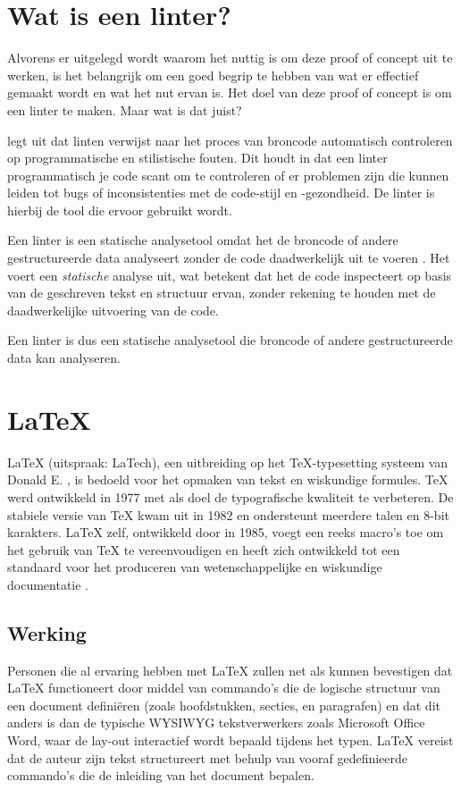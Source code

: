 \section{Wat is een linter?}
Alvorens er uitgelegd wordt waarom het nuttig is om deze proof of concept uit te werken, is het belangrijk om een goed begrip te hebben van wat er effectief gemaakt wordt en wat het nut ervan is. Het doel van deze proof of concept is om een linter te maken. Maar wat is dat juist?

\textcite{Kamunya2023} legt uit dat linten verwijst naar het proces van broncode automatisch controleren op programmatische en stilistische fouten. Dit houdt in dat een linter programmatisch je code scant om te controleren of er problemen zijn die kunnen leiden tot bugs of inconsistenties met de code-stijl en -gezondheid. De linter is hierbij de tool die ervoor gebruikt wordt.

Een linter is een statische analysetool omdat het de broncode of andere gestructureerde data analyseert zonder de code daadwerkelijk uit te voeren \autocite{Moeller2023}. Het voert een \emph{statische} analyse uit, wat betekent dat het de code inspecteert op basis van de geschreven tekst en structuur ervan, zonder rekening te houden met de daadwerkelijke uitvoering van de code.

Een linter is dus een statische analysetool die broncode of andere gestructureerde data kan analyseren.

\section{\LaTeX{}}
\LaTeX{} (uitspraak: LaTech), een uitbreiding op het \TeX{}-typesetting systeem van Donald E. \textcite{Knuth1984}, is bedoeld voor het opmaken van tekst en wiskundige formules. TeX werd ontwikkeld in 1977 met als doel de typografische kwaliteit te verbeteren. De stabiele versie van TeX kwam uit in 1982 en ondersteunt meerdere talen en 8-bit karakters. \LaTeX{} zelf, ontwikkeld door \textcite{Lamport1994} in 1985, voegt een reeks macro's toe om het gebruik van TeX te vereenvoudigen en heeft zich ontwikkeld tot een standaard voor het produceren van wetenschappelijke en wiskundige documentatie \autocite{Oetiker2023}.

\subsection{Werking}
Personen die al ervaring hebben met \LaTeX{} zullen net als \textcite{Oetiker2023} kunnen bevestigen dat \LaTeX{} functioneert door middel van commando's die de logische structuur van een document definiëren (zoals hoofdstukken, secties, en paragrafen) en dat dit anders is dan de typische \acrfull{WYSIWYG} tekstverwerkers zoals Microsoft Office Word, waar de lay-out interactief wordt bepaald tijdens het typen. \LaTeX{} vereist dat de auteur zijn tekst structureert met behulp van vooraf gedefinieerde commando's die de inleiding van het document bepalen.

